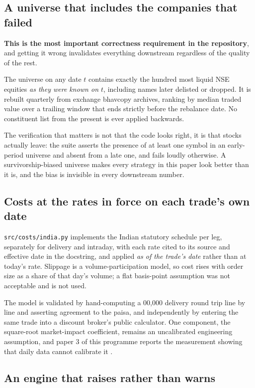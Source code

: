 \documentclass[11pt,a4paper]{article}
\begin{document}
\subsection{A universe that includes the companies that failed}

\textbf{This is the most important correctness requirement in the repository}, and getting it
wrong invalidates everything downstream regardless of the quality of the rest.

The universe on any date $t$ contains exactly the hundred most liquid NSE equities \emph{as they
were known on $t$}, including names later delisted or dropped. It is rebuilt quarterly from
exchange bhavcopy archives, ranking by median traded value over a trailing window that ends
strictly before the rebalance date. No constituent list from the present is ever applied backwards.

The verification that matters is not that the code looks right, it is that stocks actually leave:
the suite asserts the presence of at least one symbol in an early-period universe and absent from
a late one, and fails loudly otherwise. A survivorship-biased universe makes every strategy in
this paper look better than it is, and the bias is invisible in every downstream number.

\subsection{Costs at the rates in force on each trade's own date}

\texttt{src/costs/india.py} implements the Indian statutory schedule per leg, separately for
delivery and intraday, with each rate cited to its source and effective date in the docstring, and
applied \emph{as of the trade's date} rather than at today's rate. Slippage is a
volume-participation model, so cost rises with order size as a share of that day's volume; a flat
basis-point assumption was not acceptable and is not used.

The model is validated by hand-computing a 00{,}000 delivery round trip line by line
and asserting agreement to the paisa, and independently by entering the same trade into a
discount broker's public calculator. One component, the square-root market-impact coefficient,
remains an uncalibrated engineering assumption, and paper 3 of this programme reports the
measurement showing that daily data cannot calibrate it \citep{almgren2005}.

\subsection{An engine that raises rather than warns}
\end{document}
